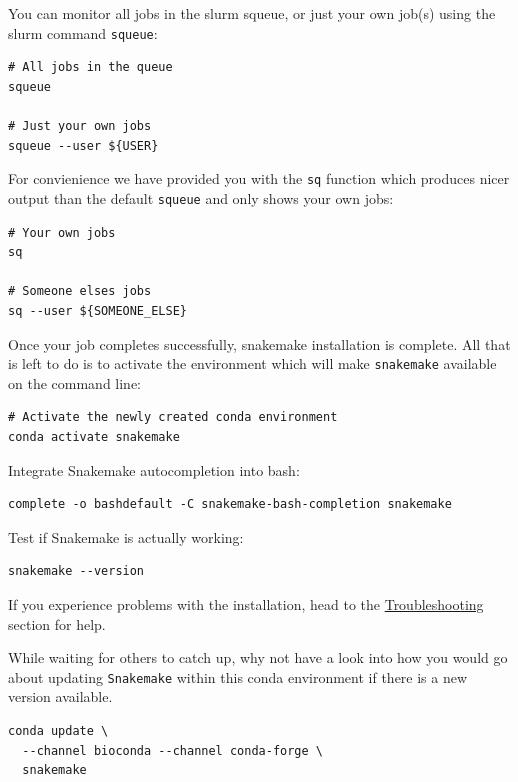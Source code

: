 \begin{note}

You can monitor all jobs in the slurm squeue, or just your own job(s) using the slurm command \texttt{squeue}:

\begin{lstlisting}
# All jobs in the queue
squeue

# Just your own jobs
squeue --user ${USER}
\end{lstlisting}

For convienience we have provided you with the \texttt{sq} function which produces nicer output than the default \texttt{squeue} and only shows your own jobs:

\begin{lstlisting}
# Your own jobs
sq

# Someone elses jobs
sq --user ${SOMEONE_ELSE}
\end{lstlisting}

\end{note}

Once your job completes successfully, snakemake installation is complete. All that is left to do is to
activate the environment which will make \texttt{snakemake} available on the command line:

\begin{steps}

\begin{lstlisting}
# Activate the newly created conda environment
conda activate snakemake
\end{lstlisting}

Integrate Snakemake autocompletion into bash:

\begin{lstlisting}
complete -o bashdefault -C snakemake-bash-completion snakemake
\end{lstlisting}

Test if Snakemake is actually working:

\begin{lstlisting}
snakemake --version
\end{lstlisting}

\end{steps}

If you experience problems with the installation, head to the \hyperref[sec:snake_trouble]{Troubleshooting} section for help.

\begin{bonus}
While waiting for others to catch up, why not have a look into how you would go about updating \texttt{Snakemake}
within this conda environment if there is a new version available.

\begin{answer}
\begin{lstlisting}
conda update \
  --channel bioconda --channel conda-forge \
  snakemake
\end{lstlisting}
\end{answer}

\end{bonus}


